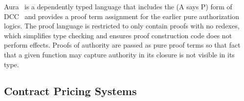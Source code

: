 Aura~\cite{Jia2008:Aura} is a dependently typed language that includes the (A says P) form of DCC~\cite{Abadi1999:DCC} and provides a proof term assignment for the earlier pure authorization logics. The proof language is restricted to only contain proofs with no redexes, which simplifies type checking and ensures proof construction code does not perform effects. Proofs of authority are passed as pure proof terms so that fact that a given function may capture authority in its closure is not visible in its type.


\subsection{Contract Pricing Systems}
